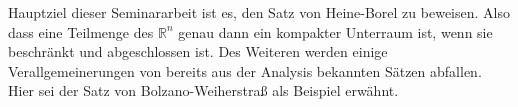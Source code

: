 Hauptziel dieser Seminararbeit ist es, den Satz von Heine-Borel zu beweisen. Also dass eine Teilmenge des
\(\mathbb{R}^n\) genau dann ein kompakter Unterraum ist, wenn sie beschränkt und abgeschlossen ist.
Des Weiteren werden einige Verallgemeinerungen von bereits aus der Analysis bekannten Sätzen abfallen.
Hier sei der Satz von Bolzano-Weiherstraß als Beispiel erwähnt.

%
%



